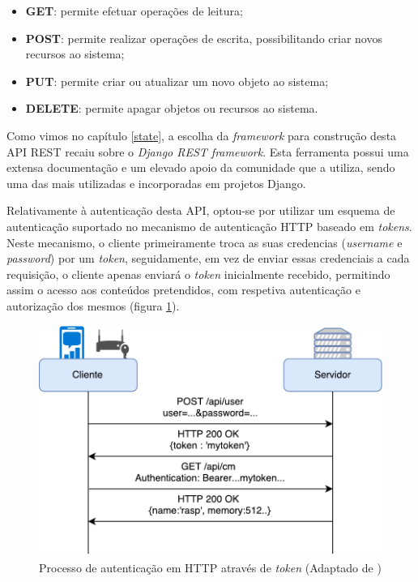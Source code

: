 \begin{itemize}
	\item \textbf{GET}: permite efetuar operações de leitura;
	\item \textbf{POST}: permite realizar operações de escrita, possibilitando criar novos recursos ao sistema;
	\item \textbf{PUT}: permite criar ou atualizar um novo objeto ao sistema;  
	\item \textbf{DELETE}: permite apagar objetos ou recursos ao sistema. 
\end{itemize}

Como vimos no capítulo \ref{state}, a escolha da \textit{framework} para construção desta \ac{API} \ac{REST} recaiu sobre o \textit{Django REST framework}. Esta ferramenta possui uma extensa documentação e um elevado apoio da comunidade que a utiliza, sendo uma das mais utilizadas e incorporadas em projetos Django. 

Relativamente à autenticação desta \ac{API}, optou-se por utilizar um esquema de autenticação suportado no mecanismo de autenticação \ac{HTTP} baseado em \textit{tokens}\cite{tokenREST}. Neste mecanismo, o cliente primeiramente troca as suas credencias (\textit{username} e \textit{password}) por um \textit{token}, seguidamente, em vez de enviar essas credenciais a cada requisição, o cliente apenas enviará o \textit{token} inicialmente recebido, permitindo assim o acesso aos conteúdos pretendidos, com respetiva autenticação e autorização dos mesmos (figura \ref{autnetAPI}).

\begin{figure}[h]
	\centering
	\includegraphics[scale=0.61]{esquemas/autenticacaohttpesquema.pdf}
	\caption[Processo de autenticação em \acs{HTTP} através de \textit{token}]{Processo de autenticação em \ac{HTTP} através de \textit{token} (Adaptado de \cite{AdoKukic2016})}
	\label{autnetAPI}
\end{figure}


